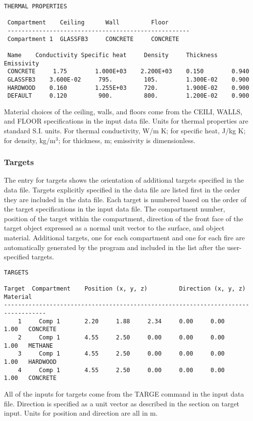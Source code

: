 \begin{lstlisting}[basicstyle=\scriptsize]
 THERMAL PROPERTIES

 Compartment    Ceiling      Wall         Floor
 ----------------------------------------------------
 Compartment 1  GLASSFB3     CONCRETE     CONCRETE

 Name    Conductivity Specific heat     Density     Thickness   Emissivity
 CONCRETE     1.75        1.000E+03    2.200E+03    0.150        0.940
 GLASSFB3    3.600E-02     795.         105.        1.300E-02    0.900
 HARDWOOD    0.160        1.255E+03     720.        1.900E-02    0.900
 DEFAULT     0.120         900.         800.        1.200E-02    0.900
\end{lstlisting}
Material choices of the ceiling, walls, and floors come from the CEILI, WALLS, and FLOOR specifications in the input data file. Units for thermal properties are standard S.I. units.  For thermal conductivity, W/m K; for specific heat, J/kg K; for density, kg/m$^3$; for thickness, m; emissivity is dimensionless.


\subsubsection{Targets}

The entry for targets shows the orientation of additional targets specified in the data file. Targets explicitly specified in the data file are listed first in the order they are included in the data file.  Each target is numbered based on the order of the target specifications in the input data file.  The compartment number, position of the target within the compartment, direction of the front face of the target object expressed as a normal unit vector to the surface, and object material. Additional targets, one for each compartment and one for each fire are automatically generated by the program and included in the list after the user-specified targets.

\begin{lstlisting}[basicstyle=\scriptsize]
TARGETS

Target  Compartment    Position (x, y, z)         Direction (x, y, z)      Material
----------------------------------------------------------------------------------
    1     Comp 1       2.20     1.88     2.34     0.00     0.00     1.00   CONCRETE
    2     Comp 1       4.55     2.50     0.00     0.00     0.00     1.00   METHANE
    3     Comp 1       4.55     2.50     0.00     0.00     0.00     1.00   HARDWOOD
    4     Comp 1       4.55     2.50     0.00     0.00     0.00     1.00   CONCRETE
\end{lstlisting}
All of the inputs for targets come from the TARGE command in the input data file. Direction is specified as a unit vector as described in the section on target input. Units for position and direction are all in m.


